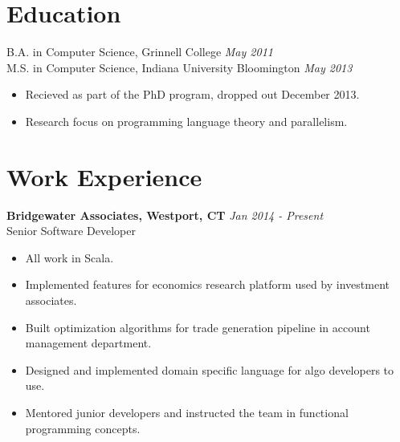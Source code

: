 \documentclass[margin]{res}
\begin{document}
 
 

\address{{\bf Contact} \\ jobs@aarontodd.name \\ (415) 847-0997 }

\address{{\bf Address} \\ 8 Haviland St. Apt B \\ Norwalk, CT 06854 }


\begin{resume} 
 
\section{Education}
B.A. in Computer Science, Grinnell College \hfill \textit{May 2011} \\
M.S. in Computer Science, Indiana University Bloomington \hfill \textit{May 2013}
\begin{itemize} \itemsep -2pt
\item Recieved as part of the PhD program, dropped out December 2013.
\item Research focus on programming language theory and parallelism.
\end{itemize}  
 

\section{Work Experience}

 {\bf Bridgewater Associates, Westport, CT} \hfill \textit{Jan 2014 - Present} \\
 Senior Software Developer
 \begin{itemize} \itemsep -2pt  %
 \item All work in Scala.
 \item Implemented features for economics research platform used by investment associates.
 \item Built optimization algorithms for trade generation pipeline in account management department.
 \item Designed and implemented domain specific language for algo developers to use.
 \item Mentored junior developers and instructed the team in functional programming concepts.
 \end{itemize}


\end{resume}
\end{document}
